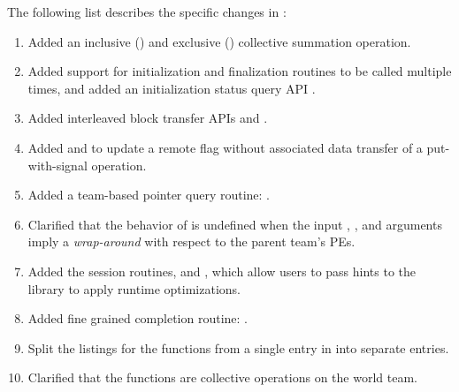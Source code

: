 The following list describes the specific changes in \openshmem[1.6]:
\begin{enumerate}
%
\item Added an inclusive () and exclusive 
() collective summation operation. 
%
\item Added support for initialization and finalization routines to be called
    multiple times, and added an initialization status query API
    .
%
%
\item Added interleaved block transfer APIs  and
    .
%
%
\item Added  and  to
  update a remote flag without associated data transfer of a put-with-signal operation.
%
%
\item Added a team-based pointer query routine:
  .
%
%
\item Clarified that the behavior of  is
    undefined when the input , , and  arguments
    imply a \textit{wrap-around} with respect to the parent team's \acp{PE}.
%
%
\item Added the session routines,  and
    , which allow users to pass hints to the
    \openshmem library to apply runtime optimizations.
%
\item Added fine grained completion routine: .
%
%
\item Split the listings for the 
  functions from a single entry in \openshmem[1.5] into separate entries.
%
%
\item Clarified that the  functions are collective operations on
    the world team.
%

\end{enumerate}
